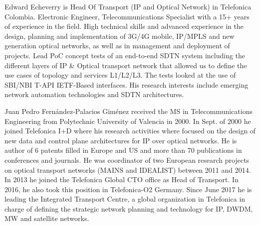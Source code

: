 \documentclass[10pt, conference]{IEEEtran}
\begin{document}
\begin{IEEEbiography}%
{Edward Echeverry} is Head Of Transport (IP and Optical Network) in Telefonica Colombia. Electronic Engineer, Telecommunications Specialist with a 15+ years of experience in the field. High technical skills and advanced experience in the design, planning and implementation of 3G/4G mobile, IP/MPLS and new generation optical networks, as well as in management and deployment of projects. Lead PoC concept tests of an end-to-end SDTN system including the different layers of IP \& Optical transport network that allowed us to define the use cases of topology and services L1/L2/L3. The tests looked at the use of SBI/NBI T-API IETF-Based interfaces. His research interests include emerging network automation technologies and SDTN architectures.\end{IEEEbiography}

\begin{IEEEbiography}%
{Juan Pedro Fernández-Palacios Giménez} received the MS in Telecommunications Engineering from Polytechnic University of Valencia in 2000. In Sept. of 2000 he joined Telefonica I+D where his research activities where focused on the design of new data and control plane architectures for IP over optical networks. He is author of 6 patents filled in Europe and US and more than 70 publications in conferences and journals. He was coordinator of two European research projects on optical transport networks (MAINS and IDEALIST) between 2011 and 2014. In 2013 he joined the Telefonica Global CTO office as Head of Transport. In 2016, he also took this position in Telefonica-O2 Germany. Since June 2017 he is leading the Integrated Transport Centre, a global organization in Telefonica in charge of defining the strategic network planning and technology for IP, DWDM, MW and satellite networks.\end{IEEEbiography}
\end{document}

